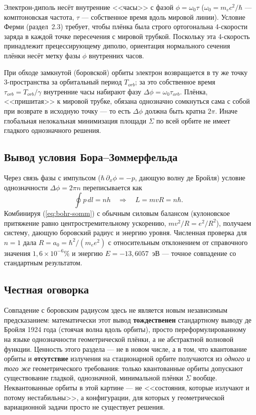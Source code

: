 \documentclass[12pt,a4paper]{article}
\begin{document}
Электрон-диполь несёт внутренние <<часы>> с фазой $\phi=\omega_0\tau$
($\omega_0=m_ec^2/\hbar$ --- комптоновская частота, $\tau$ --- собственное
время вдоль мировой линии). Условие Ферми (раздел~2.3) требует, чтобы
плёнка была строго ортогональна 4-скорости заряда в каждой точке
пересечения с мировой трубкой. Поскольку эта 4-скорость принадлежит
прецессирующему диполю, ориентация нормального сечения плёнки несёт метку
фазы $\phi$ внутренних часов.

При обходе замкнутой (боровской) орбиты электрон возвращается в ту же
точку 3-пространства за орбитальный период $T_{orb}$; за это собственное
время $\tau_{orb}=T_{orb}/\gamma$ внутренние часы набирают фазу
$\Delta\phi=\omega_0\tau_{orb}$. Плёнка, <<пришитая>> к мировой трубке,
обязана однозначно сомкнуться сама с собой при возврате в исходную
точку --- то есть $\Delta\phi$ должна быть кратна $2\pi$. Иначе
глобальная нелокальная минимизация площади $\Sigma$ по всей орбите не
имеет гладкого однозначного решения.

\subsection{Вывод условия Бора--Зоммерфельда}

Через связь фазы с импульсом ($\hbar\,\partial_x\phi=-p$, дающую волну
де Бройля) условие однозначности $\Delta\phi=2\pi n$ переписывается как
\begin{equation}
\oint p\,dl = nh \quad\Longrightarrow\quad L = mvR = n\hbar.
\label{eq:bohr-somm}
\end{equation}
Комбинируя (\ref{eq:bohr-somm}) с обычным силовым балансом (кулоновское
притяжение равно центростремительному ускорению, $mv^2/R=e^2/R^2$),
получаем систему, дающую боровский радиус и энергию уровня. Численная
проверка для $n=1$ дала $R=a_0=\hbar^2/(m_ee^2)$ с относительным
отклонением от справочного значения $1{,}6\times10^{-6}\%$ и энергию
$E=-13{,}6057$~эВ --- точное совпадение со стандартным результатом.

\subsection{Честная оговорка}

Совпадение с боровским радиусом здесь не является новым независимым
предсказанием: математически этот вывод \textbf{тождественен} стандартному
выводу де Бройля 1924 года (стоячая волна вдоль орбиты), просто
переформулированному на языке однозначности геометрической плёнки, а не
абстрактной волновой функции. Ценность этого раздела --- не в новом
числе, а в том, что квантование орбиты и \textbf{отсутствие} излучения на
стационарной орбите получаются из \emph{одного и того же} геометрического
требования: только квантованные орбиты допускают существование гладкой,
однозначной, минимальной плёнки $\Sigma$ вообще. Неквантованные орбиты в
этой картине --- не <<состояния, которые излучают и потому нестабильны>>,
а конфигурации, для которых у геометрической вариационной задачи просто
не существует решения.
\end{document}

